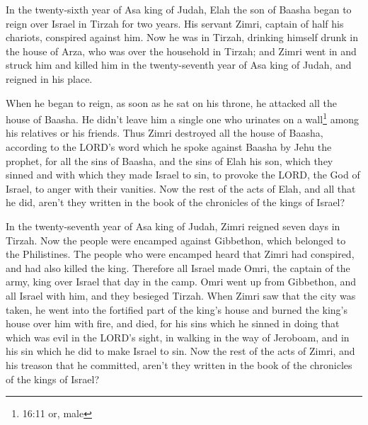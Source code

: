 \myverse{}In the twenty-sixth year of Asa king of Judah, Elah the son of
Baasha began to reign over Israel in Tirzah for two years.
\myverse{}His servant Zimri, captain of half his chariots, conspired against him. Now
he was in Tirzah, drinking himself drunk in the house of Arza, who was over the household in Tirzah;
\myverse{}and Zimri went in and struck him and killed him in the twenty-seventh year
of Asa king of Judah, and reigned in his place.

\myverse{}When he began to reign, as soon as he sat on his throne, he
attacked all the house of Baasha. He didn’t leave him a single one who urinates on a wall\footnote{16:11 or, male} among his relatives or his friends.
\myverse{}Thus Zimri destroyed all the house of Baasha, according to the LORD’s word
which he spoke against Baasha by Jehu the prophet,
\myverse{}for all the sins of Baasha, and the sins of Elah his son, which they sinned
and with which they made Israel to sin, to provoke the LORD, the God of Israel, to anger with their vanities.
\myverse{}Now the rest of the acts of Elah, and all that he did, aren’t they written
in the book of the chronicles of the kings of Israel?

\myverse{}In the twenty-seventh year of Asa king of Judah, Zimri reigned
seven days in Tirzah. Now the people were encamped against Gibbethon, which belonged to the Philistines.
\myverse{}The people who were encamped heard that Zimri had conspired, and had also
killed the king. Therefore all Israel made Omri, the captain of the army, king over Israel that day in
the camp.
\myverse{}Omri went up from Gibbethon, and all Israel with him, and they besieged Tirzah.
\myverse{}When Zimri saw that the city was taken, he went into the fortified part of
the king’s house and burned the king’s house over him with fire, and died,
\myverse{}for his sins which he sinned in doing that which was evil in the LORD’s sight,
in walking in the way of Jeroboam, and in his sin which he did to make Israel to sin.
\myverse{}Now the rest of the acts of Zimri, and his treason that he committed, aren’t
they written in the book of the chronicles of the kings of Israel?


